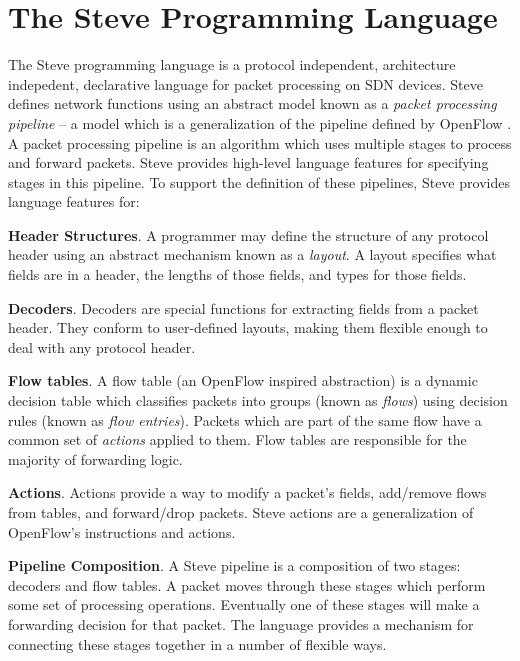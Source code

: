 \section{The Steve Programming Language}

The Steve programming language is a protocol independent, architecture indepedent,
declarative language for packet processing on SDN devices.
Steve defines network functions using an abstract model
known as a \emph{packet processing pipeline} -- a model which is a generalization
of the pipeline defined by OpenFlow \cite{openflow_spec}.
A packet processing pipeline is an algorithm which
uses multiple stages to process and forward packets.
Steve provides high-level language features for specifying stages in this pipeline.
To support the definition of these pipelines, Steve provides language features
for:

\textbf{Header Structures}.
A programmer may define the structure of any protocol header using an abstract
mechanism known as a \emph{layout}.
A layout specifies what fields are in a header, the lengths of those fields,
and types for those fields.

\textbf{Decoders}. Decoders are special functions for extracting fields from a
packet header. They conform to user-defined layouts, making them flexible enough
to deal with any protocol header.

%

\textbf{Flow tables}. A flow table (an OpenFlow inspired abstraction) is a dynamic
decision table which classifies packets into groups (known as \emph{flows}) using
decision rules (known as \emph{flow entries}).
Packets which are part of the same flow have a common set of \emph{actions}
applied to them.
Flow tables are responsible for the majority of forwarding logic.

\textbf{Actions}. Actions provide a way to modify a packet's fields, add/remove
flows from tables, and forward/drop packets. Steve actions are a generalization
of OpenFlow's instructions and actions.

\textbf{Pipeline Composition}. A Steve pipeline is a composition of two stages:
decoders and flow tables.
A packet moves through these stages which perform some set of processing operations.
Eventually one of these stages will make a forwarding decision for that packet.
The language provides a mechanism for connecting these
stages together in a number of flexible ways.

